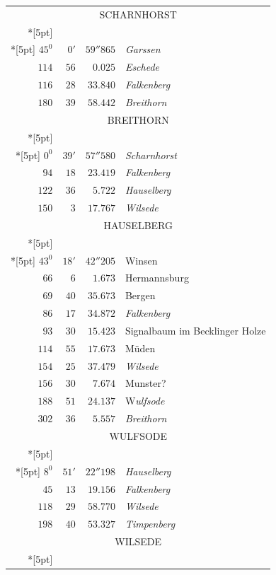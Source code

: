 \clearpage
{}%
\begingroup
\fontsize{10.5}{13}\selectfont
\setlength{\tabcolsep}{3pt}
\setlength{\LTpre}{2pt}
\setlength{\LTpost}{2pt}
\begin{longtable}{@{}rrrp{.61\linewidth}@{}}
\multicolumn{4}{c}{\strut SCHARNHORST}\\*[5pt]
\multicolumn{4}{c}{\(-133392.348\)\qquad\(-21418.103\)}\\*[5pt]
\(45^{0}\)&\(0'\)&\(59''865\)&\raggedright \textit{Garssen}\tabularnewline
\(114\)&\(56\)&\(0.025\)&\raggedright \textit{Eschede}\tabularnewline
\(116\)&\(28\)&\(33.840\)&\raggedright \textit{Falkenberg}\tabularnewline
\(180\)&\(39\)&\(58.442\)&\raggedright \textit{Breithorn}\tabularnewline
\multicolumn{4}{c}{\strut BREITHORN}\\*[5pt]
\multicolumn{4}{c}{\(-144611.129\)\qquad\(-21548.543\)}\\*[5pt]
\(0^{0}\)&\(39'\)&\(57''580\)&\raggedright \textit{Scharnhorst}\tabularnewline
\(94\)&\(18\)&\(23.419\)&\raggedright \textit{Falkenberg}\tabularnewline
\(122\)&\(36\)&\(5.722\)&\raggedright \textit{Hauselberg}\tabularnewline
\(150\)&\(3\)&\(17.767\)&\raggedright \textit{Wilsede}\tabularnewline
\multicolumn{4}{c}{\strut HAUSELBERG}\\*[5pt]
\multicolumn{4}{c}{\(-148006.363\)\qquad\(-16239.880\)}\\*[5pt]
\(43^{0}\)&\(18'\)&\(42''205\)&\raggedright Winsen\tabularnewline
\(66\)&\(6\)&\(1.673\)&\raggedright Hermannsburg\tabularnewline
\(69\)&\(40\)&\(35.673\)&\raggedright Bergen\tabularnewline
\(86\)&\(17\)&\(34.872\)&\raggedright \textit{Falkenberg}\tabularnewline
\(93\)&\(30\)&\(15.423\)&\raggedright Signalbaum im Becklinger Holze\tabularnewline
\(114\)&\(55\)&\(17.673\)&\raggedright Müden\tabularnewline
\(154\)&\(25\)&\(37.479\)&\raggedright \textit{Wilsede}\tabularnewline
\(156\)&\(30\)&\(7.674\)&\raggedright Munster?\tabularnewline
\(188\)&\(51\)&\(24.137\)&\raggedright W\textit{ulfsode}\tabularnewline
\(302\)&\(36\)&\(5.557\)&\raggedright \textit{Breithorn}\tabularnewline
\multicolumn{4}{c}{\strut WULFSODE}\\*[5pt]
\multicolumn{4}{c}{\(-171465.593\)\qquad\(-19895.232\)}\\*[5pt]
\(8^{0}\)&\(51'\)&\(22''198\)&\raggedright \textit{Hauselberg}\tabularnewline
\(45\)&\(13\)&\(19.156\)&\raggedright \textit{Falkenberg}\tabularnewline
\(118\)&\(29\)&\(58.770\)&\raggedright \textit{Wilsede}\tabularnewline
\(198\)&\(40\)&\(53.327\)&\raggedright \textit{Timpenberg}\tabularnewline
\multicolumn{4}{c}{\strut WILSEDE}\\*[5pt]

\end{longtable}
